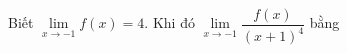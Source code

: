 \begin{ex}
Biết $\lim\limits_{x\to-1}f(x)=4$. Khi đó $\lim\limits_{x\to-1}\dfrac{f(x)}{(x+1)^4}$ bằng
\end{ex}
